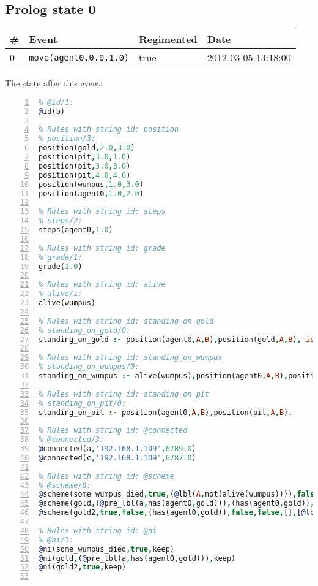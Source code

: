 \documentclass[11pt]{article}\usepackage[utf8]{inputenc}\usepackage{geometry}
\begin{document}
\subsection{Prolog state 0}
\begin{table}[ht]
\centering 
\begin{tabular}{l l l l} 
\textbf{\#} & \textbf{Event} & \textbf{Regimented} & \textbf{Date} \\ [0.5ex] 
\hline
0&\texttt{move(agent0,0.0,1.0)}&true&2012-03-05 13:18:00\\ [1ex] \hline\end{tabular}
\end{table}
The state after this event:

\lstset{breaklines=true}\begin{lstlisting}[language=Prolog, numbers=left]
% Rules with string id: @id
% @id/1:
@id(b)

% Rules with string id: position
% position/3:
position(gold,2.0,3.0)
position(pit,3.0,1.0)
position(pit,3.0,3.0)
position(pit,4.0,4.0)
position(wumpus,1.0,3.0)
position(agent0,1.0,2.0)

% Rules with string id: steps
% steps/2:
steps(agent0,1.0)

% Rules with string id: grade
% grade/1:
grade(1.0)

% Rules with string id: alive
% alive/1:
alive(wumpus)

% Rules with string id: standing_on_gold
% standing_on_gold/0:
standing_on_gold :- position(agent0,A,B),position(gold,A,B), is (C,+(A,B)),>(C,2.0).

% Rules with string id: standing_on_wumpus
% standing_on_wumpus/0:
standing_on_wumpus :- alive(wumpus),position(agent0,A,B),position(wumpus,A,B).

% Rules with string id: standing_on_pit
% standing_on_pit/0:
standing_on_pit :- position(agent0,A,B),position(pit,A,B).

% Rules with string id: @connected
% @connected/3:
@connected(a,'192.168.1.109',6789.0)
@connected(c,'192.168.1.109',6787.0)

% Rules with string id: @scheme
% @scheme/8:
@scheme(some_wumpus_died,true,(@lbl(A,not(alive(wumpus)))),false,false,false,[update(bombard_wumpus)|[]],[])
@scheme(gold,(@pre_lbl(a,has(agent0,gold))),(has(agent0,gold)),false,(@lbl(a,not(has(agent0,gold)))),false,[update(force_drop)|[]],[])
@scheme(gold2,true,false,(has(agent0,gold)),false,false,[],[@lbl(c,update(bombard_wumpus))|[]])

% Rules with string id: @ni
% @ni/3:
@ni(some_wumpus_died,true,keep)
@ni(gold,(@pre_lbl(a,has(agent0,gold))),keep)
@ni(gold2,true,keep)


\end{lstlisting}
\end{document}
